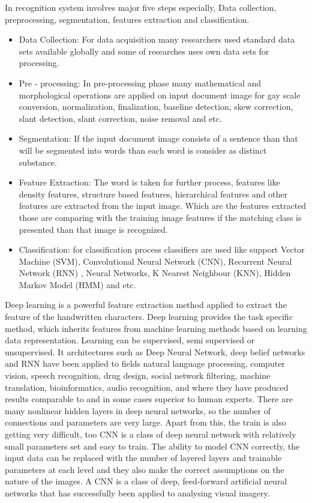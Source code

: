 \documentclass[a4paper,12pt]{report}
\begin{document}
In recognition system involves major five steps especially, Data collection, preprocessing, segmentation, features extraction and classification.
\begin{itemize}
\item Data Collection: For data acquisition many researchers used standard data sets available globally and some of researches uses own data sets for processing.
\item Pre - processing: In pre-processing phase many mathematical and morphological operations are applied on input document image for gay scale conversion, normalization, finalization, baseline detection, skew correction, slant detection, slant correction, noise removal and etc.
\item Segmentation: If the input document image consists of a sentence than that will be segmented into words than each word is consider as distinct substance.
\item Feature Extraction: The word is taken for further process, features like density features, structure based features, hierarchical features and other features are extracted from the input image. Which are the features extracted those are comparing with the training image features if the matching class is presented than that image is recognized.
\item Classification: for classification process classifiers are used like support Vector Machine (SVM), Convolutional Neural Network (CNN), Recurrent Neural Network (RNN) , Neural Networks, K Nearest Neighbour (KNN), Hidden Markov Model (HMM) and etc.
\end{itemize}


Deep learning is a powerful feature extraction method applied to extract the feature of the handwritten characters. Deep learning provides the task specific method, which inherits features from machine learning methods based on learning data representation. Learning can be supervised, semi supervised or unsupervised. It architectures such as Deep Neural Network, deep belief networks and RNN have been applied to fields natural language processing, computer vision, speech recognition, drug design, social network filtering, machine translation, bioinformatics, audio recognition, and where they have produced results comparable to and in some cases superior to human experts. There are many nonlinear hidden layers in deep neural networks, so the number of connections and parameters are very large. Apart from this, the train is also getting very difficult, too CNN is a class of deep neural network with relatively small parameters set and easy to train. The ability to model CNN correctly, the input data can be replaced with the number of layered layers and trainable parameters at each level and they also make the correct assumptions on the nature of the images. A CNN is a class of deep, feed-forward artificial neural networks that has successfully been applied to analysing visual imagery.
\end{document}
